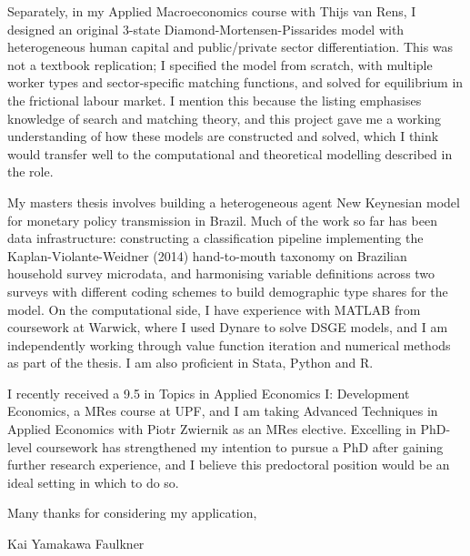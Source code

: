 \documentclass[11pt]{article}
\begin{document}
Separately, in my Applied Macroeconomics course with Thijs van Rens, I designed an original 3-state Diamond-Mortensen-Pissarides model with heterogeneous human capital and public/private sector differentiation. This was not a textbook replication; I specified the model from scratch, with multiple worker types and sector-specific matching functions, and solved for equilibrium in the frictional labour market. I mention this because the listing emphasises knowledge of search and matching theory, and this project gave me a working understanding of how these models are constructed and solved, which I think would transfer well to the computational and theoretical modelling described in the role.

My masters thesis involves building a heterogeneous agent New Keynesian model for monetary policy transmission in Brazil. Much of the work so far has been data infrastructure: constructing a classification pipeline implementing the Kaplan-Violante-Weidner (2014) hand-to-mouth taxonomy on Brazilian household survey microdata, and harmonising variable definitions across two surveys with different coding schemes to build demographic type shares for the model. On the computational side, I have experience with MATLAB from coursework at Warwick, where I used Dynare to solve DSGE models, and I am independently working through value function iteration and numerical methods as part of the thesis. I am also proficient in Stata, Python and R.

I recently received a 9.5 in Topics in Applied Economics I: Development Economics, a MRes course at UPF, and I am taking Advanced Techniques in Applied Economics with Piotr Zwiernik as an MRes elective. Excelling in PhD-level coursework has strengthened my intention to pursue a PhD after gaining further research experience, and I believe this predoctoral position would be an ideal setting in which to do so.

\vspace{0.5em}
Many thanks for considering my application,

\vspace{0.9em}
Kai Yamakawa Faulkner
\end{document}
